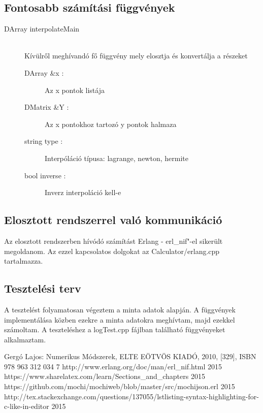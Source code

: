 \documentclass{elteikthesis}
\begin{document}
\subsection{Fontosabb számítási függvények}

\begin{description}
	\item[DArray interpolateMain] 
	\hfill \\ Kívülről meghívandó fő függvény mely elosztja és konvertálja a részeket
	\begin{description}
	  \item[DArray \&x :] Az x pontok listája 
	  \item[DMatrix \&Y :] Az x pontokhoz tartozó y pontok halmaza
	  \item[string type :] Interpóláció típusa: lagrange, newton, hermite
	  \item[bool inverse :] Inverz interpoláció kell-e
	\end{description}
\end{description}
\subsection{Elosztott rendszerrel való kommunikáció}
Az elosztott rendszerben hívódó számítást Erlang - erl\_nif"-el sikerült megoldanom. 
Az ezzel kapcsolatos dolgokat az Calculator/erlang.cpp tartalmazza. 
\subsection{Tesztelési terv}
A tesztelést folyamatosan végeztem a minta adatok alapján. A függvények implementálása közben ezekre a minta adatokra meghívtam, majd ezekkel számoltam. A teszteléshez a logTest.cpp fájlban található függvényeket alkalmaztam. 


\begin{thebibliography}{9}
Gergó Lajos: Numerikus Módszerek, ELTE EÖTVÖS KIADÓ, 2010, [329], ISBN 978 963 312 034 7
\bibitem{} {http://www.erlang.org/doc/man/erl\_nif.html} 2015
\bibitem{} {https://www.sharelatex.com/learn/Sections\_and\_chapters} 
2015
\bibitem{} {https://github.com/mochi/mochiweb/blob/master/src/mochijson.erl} 2015
\bibitem{} {http://tex.stackexchange.com/questions/137055/lstlisting-syntax-highlighting-for-c-like-in-editor} 2015
\end{thebibliography}
\end{document}
